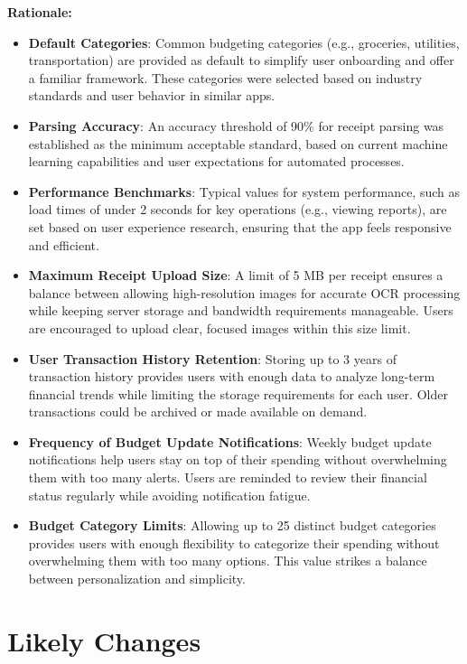 \documentclass[12pt]{article}
\begin{document}
\noindent\textbf{Rationale:}
\begin{itemize}
    \item \textbf{Default Categories}: Common budgeting categories (e.g., groceries, utilities, transportation) are provided as default to simplify user onboarding and offer a familiar framework. These categories were selected based on industry standards and user behavior in similar apps.
    \item \textbf{Parsing Accuracy}: An accuracy threshold of 90\% for receipt parsing was established as the minimum acceptable standard, based on current machine learning capabilities and user expectations for automated processes.
    \item \textbf{Performance Benchmarks}: Typical values for system performance, such as load times of under 2 seconds for key operations (e.g., viewing reports), are set based on user experience research, ensuring that the app feels responsive and efficient.
    \item \textbf{Maximum Receipt Upload Size}: A limit of 5 MB per receipt ensures a balance between allowing high-resolution images for accurate OCR processing while keeping server storage and bandwidth requirements manageable. Users are encouraged to upload clear, focused images within this size limit.
    \item \textbf{User Transaction History Retention}: Storing up to 3 years of transaction history provides users with enough data to analyze long-term financial trends while limiting the storage requirements for each user. Older transactions could be archived or made available on demand.
    \item \textbf{Frequency of Budget Update Notifications}: Weekly budget update notifications help users stay on top of their spending without overwhelming them with too many alerts. Users are reminded to review their financial status regularly while avoiding notification fatigue.
    \item \textbf{Budget Category Limits}: Allowing up to 25 distinct budget categories provides users with enough flexibility to categorize their spending without overwhelming them with too many options. This value strikes a balance between personalization and simplicity.
\end{itemize}

\newpage 

\section{Likely Changes}    
\end{document}
